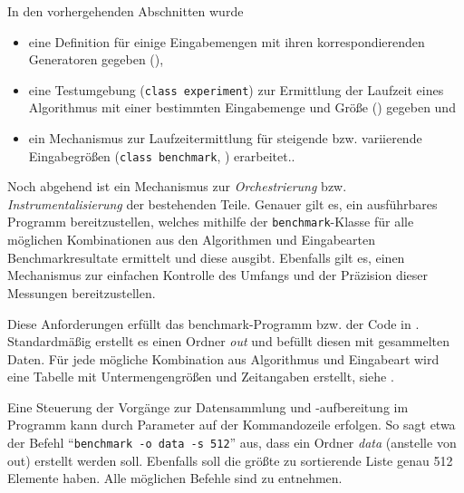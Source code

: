 In den vorhergehenden Abschnitten wurde

\begin{itemize}
    \item eine Definition für einige Eingabemengen mit ihren korrespondierenden Generatoren gegeben (),
    \item eine Testumgebung (\lstinline{class experiment}) zur Ermittlung der Laufzeit eines Algorithmus mit einer bestimmten Eingabemenge und Größe () gegeben und
    \item ein Mechanismus zur Laufzeitermittlung für steigende bzw. variierende Eingabegrößen (\lstinline{class benchmark}, ) erarbeitet..
\end{itemize}

Noch abgehend ist ein Mechanismus zur \emph{Orchestrierung} bzw. \emph{Instrumentalisierung} der bestehenden Teile. Genauer gilt es, ein ausführbares Programm bereitzustellen, welches mithilfe der \lstinline{benchmark}-Klasse für alle möglichen Kombinationen aus den Algorithmen und Eingabearten Benchmarkresultate ermittelt und diese ausgibt. Ebenfalls gilt es, einen Mechanismus zur einfachen Kontrolle des Umfangs und der Präzision dieser Messungen bereitzustellen.



Diese Anforderungen erfüllt das benchmark-Programm bzw. der Code in \crMain. Standardmäßig erstellt es einen Ordner \emph{out} und befüllt diesen mit gesammelten Daten. Für jede mögliche Kombination aus Algorithmus und Eingabeart wird eine Tabelle mit Untermengengrößen und Zeitangaben erstellt, siehe .

Eine Steuerung der Vorgänge zur Datensammlung und -aufbereitung im Programm kann durch Parameter auf der Kommandozeile erfolgen. So sagt etwa der Befehl \enquote{\lstinline{benchmark -o data -s 512}} aus, dass ein Ordner \emph{data} (anstelle von out) erstellt werden soll. Ebenfalls soll die größte zu sortierende Liste genau 512 Elemente haben. Alle möglichen Befehle sind  zu entnehmen.

